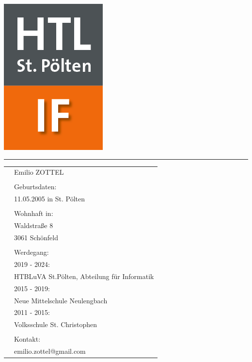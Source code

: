 \begin{flushleft}
    \hspace{3cm} \includegraphics[scale=0.3]{images/HTL_IF.png} 
    
    \vspace{-0.9cm}
    \hspace{6cm}
    \textcolor{green}{\rule{8cm}{5pt}}
\end{flushleft}

\begin{tabular}{p{3cm}l}
    & Emilio ZOTTEL \\
    \\
    & Geburtsdaten: \\
    &11.05.2005 in St. Pölten \\
    \\
    &Wohnhaft in: \\
    &Waldstraße 8 \\
    &3061 Schönfeld \\
    \\
    &Werdegang:\\
    &2019 - 2024: \\
    &HTBLuVA St.Pölten, Abteilung für Informatik \\
    &2015 - 2019: \\
    &Neue Mittelschule Neulengbach \\
    &2011 - 2015: \\
    &Volksschule St. Christophen \\
    \\
    &Kontakt: \\
    &emilio.zottel@gmail.com \\
\end{tabular}
\clearpage


